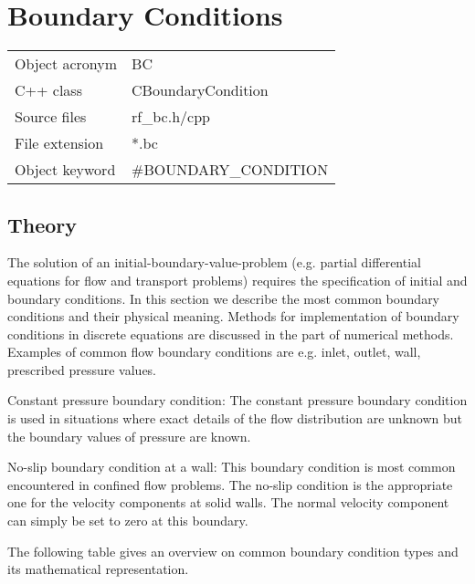 \section{Boundary Conditions}

\begin{tabular*}{8.35cm}{|p{2.5cm}|p{5cm}|} \hline
Object acronym & BC \\
C++ class      & CBoundaryCondition \\
Source files   & rf\_bc.h/cpp \\
\hline
File extension & *.bc \\
Object keyword & \#BOUNDARY\_CONDITION \\
\hline
\end{tabular*}

\subsection{Theory}

The solution of an initial-boundary-value-problem (e.g. partial
differential equations for flow and transport problems) requires
the specification of initial and boundary conditions. In this
section we describe the most common boundary conditions and their
physical meaning. Methods for implementation of boundary
conditions in discrete equations are discussed in the part of
numerical methods. Examples of common flow boundary conditions are
e.g. inlet, outlet, wall, prescribed pressure values.

Constant pressure boundary condition: The constant pressure
boundary condition is used in situations where exact details of
the flow distribution are unknown but the boundary values of
pressure are known.

No-slip boundary condition at a wall: This boundary condition is
most common encountered in confined flow problems. The no-slip
condition is the appropriate one for the velocity components at
solid walls. The normal velocity component can simply be set to
zero at this boundary. 

The following table gives an overview on common boundary condition
types and its mathematical representation.

